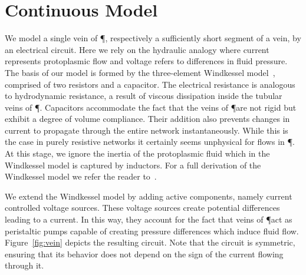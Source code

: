 

\section{Continuous Model}\label{sec:continuous}

  We model a single vein of \P, respectively a sufficiently short segment of a vein, by an electrical circuit. Here we rely on the hydraulic analogy where current represents protoplasmic flow and voltage refers to differences in fluid pressure. The basis of our model is formed by the three-element Windkessel model~\cite{hales1733statical,frank1899grundform}, comprised of two resistors and a capacitor. The electrical resistance is analogous to hydrodynamic resistance, a result of viscous dissipation inside the tubular veins of \P. Capacitors accommodate the fact that the veins of \P are not rigid but exhibit a degree of volume compliance. Their addition also prevents changes in current to propagate through the entire network instantaneously. While this is the case in purely resistive networks it certainly seems unphysical for flows in \P. At this stage, we ignore the inertia of the protoplasmic fluid which in the Windkessel model is captured by inductors. For a full derivation of the Windkessel model we refer the reader to~\cite{olufsen2004deriving}.

  We extend the Windkessel model by adding active components, namely current controlled voltage sources. These voltage sources create potential differences leading to a current. In this way, they account for the fact that veins of \P act as peristaltic pumps capable of creating pressure differences which induce fluid flow. Figure~\ref{fig:vein} depicts the resulting circuit. Note that the circuit is symmetric, ensuring that its behavior does not depend on the sign of the current flowing through it. 


